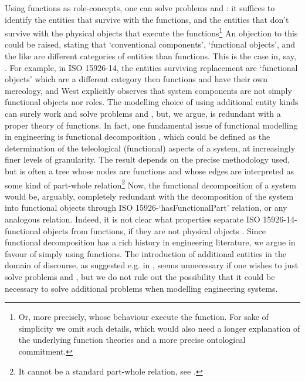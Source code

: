 \documentclass[
]{ceurart}
\begin{document}
Using functions as role-concepts, one can solve problems  and : it suffices to identify the entities that survive with the functions, and the entities that don't survive with the physical objects that execute the functions\footnote{Or, more precisely, whose behaviour execute the function. For sake of simplicity we omit such details, which would also need a longer explanation of the underlying function theories and a more precise ontological commitment.} 
An objection to this could be raised, stating that `conventional components', `functional objects', and the like are different categories of entities than functions. This is the case in, say, \cite{westDevelopingHighQuality2011,guarinoArtefactualSystemsMissing2014,kluwerISO159261420202020}. For example, in ISO 15926-14, the entities surviving replacement are `functional objects' which are a different category then functions and have their own mereology, and West \cite{westDevelopingHighQuality2011} explicitly observes that system components are not simply functional objects nor roles. 
The modelling choice of using additional entity kinds can surely work and solve problems   and , but, we argue, is redundant with a proper theory of functions. 
In fact, one fundamental issue of functional modelling in engineering is functional decomposition , which could be defined as the determination of the teleological (functional) aspects of a system, at increasingly finer levels of granularity. The result depends on the precise methodology used, but is often a tree whose nodes are functions and whose edges are interpreted as some kind of part-whole relation\footnote{It cannot be a standard part-whole relation, see \cite{vermaasFormalImpossibilityAnalysing2013}.}
Now, the functional decomposition of a system would be, arguably, completely redundant with the decomposition of the system into functional objects through ISO 15926-`hasFunctionalPart' relation, or any analogous relation. Indeed, it is not clear what properties separate ISO 15926-14-functional objects from functions, if they are not physical objects . Since functional decomposition has a rich history in engineering literature, we argue in favour of simply using functions.
The introduction of additional entities in the domain of discourse, as suggested e.g. in \cite{westDevelopingHighQuality2011,guarinoArtefactualSystemsMissing2014}, seems unnecessary if one wishes to just solve problems  and , but we do not rule out the possibility that it could be necessary to solve additional problems when modelling engineering systems.
\end{document}
